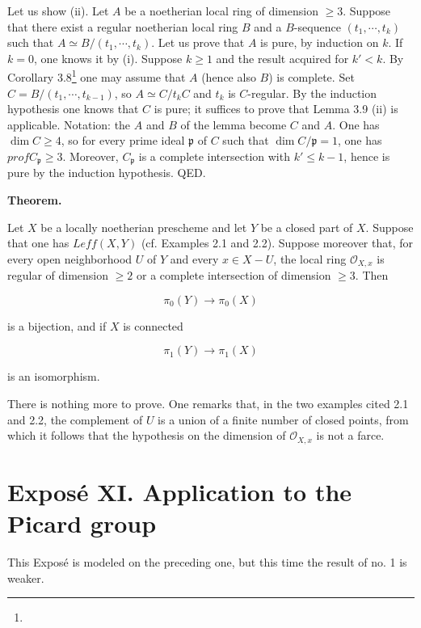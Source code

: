 \documentclass[
  11pt,
  a4paper,
]{book}
\begin{document}
Let us show (ii). Let \(A\) be a noetherian local ring of dimension
\(\geqslant 3\). Suppose that there exist a regular noetherian local
ring \(B\) and a \(B\)-sequence \((t_{1}, \cdots, t_{k})\) such that
\(A \simeq B/(t_{1}, \cdots, t_{k})\). Let us prove that \(A\) is pure,
by induction on \(k\). If \(k = 0\), one knows it by (i). Suppose
\(k \geqslant 1\) and the result acquired for \(k' < k\). By Corollary
3.8\footnote{} one may assume that \(A\) (hence also \(B\)) is complete.
Set \(C =
B/(t_{1}, \cdots, t_{k-1})\), so \(A \simeq C/t_{k} C\) and \(t_{k}\) is
\(C\)-regular. By the induction hypothesis one knows that \(C\) is pure;
it suffices to prove that Lemma 3.9 (ii) is applicable. Notation: the
\(A\) and \(B\) of the lemma become \(C\) and \(A\). One has
\(\dim C \geqslant 4\), so for every prime ideal \(\mathfrak{p}\) of
\(C\) such that \(\dim C/\mathfrak{p}
= 1\), one has \(prof C_{\mathfrak{p}} \geqslant 3\). Moreover,
\(C_{\mathfrak{p}}\) is a complete intersection with \(k'
\leqslant k - 1\), hence is pure by the induction hypothesis. QED.

\textbf{Theorem.}

Let \(X\) be a locally noetherian prescheme and let \(Y\) be a closed
part of \(X\). Suppose that one has \(Leff(X, Y)\) (cf. Examples 2.1 and
2.2). Suppose moreover that, for every open neighborhood \(U\) of \(Y\)
and every \(x \in X - U\), the local ring \(\mathcal{O}_{X,x}\) is
regular of dimension \(\geqslant 2\) or a complete intersection of
dimension \(\geqslant 3\). Then

\[ \pi_{0}(Y) \longrightarrow \pi_{0}(X) \]

is a bijection, and if \(X\) is connected

\[ \pi_{1}(Y) \longrightarrow \pi_{1}(X) \]

is an isomorphism.

There is nothing more to prove. One remarks that, in the two examples
cited 2.1 and 2.2, the complement of \(U\) is a union of a finite number
of closed points, from which it follows that the hypothesis on the
dimension of \(\mathcal{O}_{X,x}\) is not a farce.

\chapter{Exposé XI. Application to the Picard
group}\label{exposuxe9-xi.-application-to-the-picard-group}

This Exposé is modeled on the preceding one, but this time the result of
no. 1 is weaker.
\end{document}
